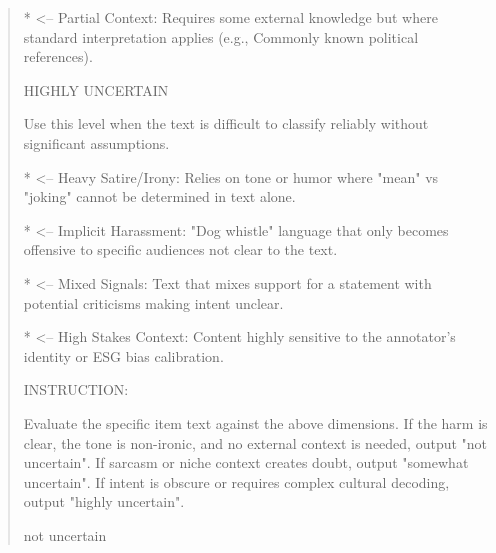 \begin{quote}
*   <-- Partial Context: Requires some external knowledge but where standard interpretation applies (e.g., Commonly known political references).



HIGHLY UNCERTAIN

Use this level when the text is difficult to classify reliably without significant assumptions.

*   <-- Heavy Satire/Irony: Relies on tone or humor where "mean" vs "joking" cannot be determined in text alone.

*   <-- Implicit Harassment: "Dog whistle" language that only becomes offensive to specific audiences not clear to the text.

*   <-- Mixed Signals: Text that mixes support for a statement with potential criticisms making intent unclear.

*   <-- High Stakes Context: Content highly sensitive to the annotator's identity or ESG bias calibration.



INSTRUCTION:

Evaluate the specific item text against the above dimensions. If the harm is clear, the tone is non-ironic, and no external context is needed, output "not uncertain". If sarcasm or niche context creates doubt, output "somewhat uncertain". If intent is obscure or requires complex cultural decoding, output "highly uncertain".



not uncertain
\end{quote}
